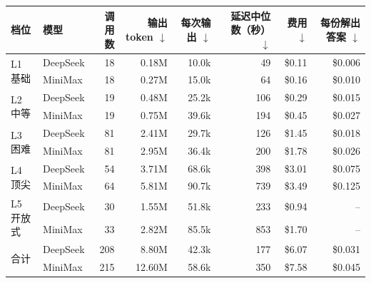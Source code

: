\begin{tabular}{llrrrrrr}
\toprule
档位 & 模型 & 调用数 & 输出 token $\downarrow$ & 每次输出 $\downarrow$ & 延迟中位数（秒）$\downarrow$ & 费用 $\downarrow$ & 每份解出答案 $\downarrow$ \\
\midrule
\multirow{2}{*}{L1 基础} & DeepSeek & 18 & 0.18M & 10.0k & 49 & \$0.11 & \$0.006 \\
 & MiniMax & 18 & 0.27M & 15.0k & 64 & \$0.16 & \$0.010 \\
\midrule
\multirow{2}{*}{L2 中等} & DeepSeek & 19 & 0.48M & 25.2k & 106 & \$0.29 & \$0.015 \\
 & MiniMax & 19 & 0.75M & 39.6k & 194 & \$0.45 & \$0.027 \\
\midrule
\multirow{2}{*}{L3 困难} & DeepSeek & 81 & 2.41M & 29.7k & 126 & \$1.45 & \$0.018 \\
 & MiniMax & 81 & 2.95M & 36.4k & 200 & \$1.78 & \$0.026 \\
\midrule
\multirow{2}{*}{L4 顶尖} & DeepSeek & 54 & 3.71M & 68.6k & 398 & \$3.01 & \$0.075 \\
 & MiniMax & 64 & 5.81M & 90.7k & 739 & \$3.49 & \$0.125 \\
\midrule
\multirow{2}{*}{L5 开放式} & DeepSeek & 30 & 1.55M & 51.8k & 233 & \$0.94 & -- \\
 & MiniMax & 33 & 2.82M & 85.5k & 853 & \$1.70 & -- \\
\midrule
\multirow{2}{*}{合计} & DeepSeek & 208 & 8.80M & 42.3k & 177 & \$6.07 & \$0.031 \\
 & MiniMax & 215 & 12.60M & 58.6k & 350 & \$7.58 & \$0.045 \\
\bottomrule
\end{tabular}
